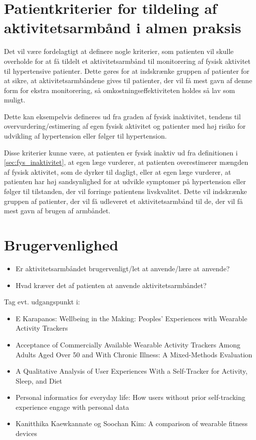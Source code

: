 \section{Patientkriterier for tildeling af aktivitetsarmbånd i almen praksis}

\noindent
Det vil være fordelagtigt at definere nogle kriterier, som patienten vil skulle overholde for at få tildelt et aktivitetsarmbånd til monitorering af fysisk aktivitet til hypertensive patienter. Dette gøres for at indskrænke gruppen af patienter for at sikre, at aktivitetsarmbåndene gives til patienter, der vil få mest gavn af denne form for ekstra monitorering, så omkostningseffektiviteten holdes så lav som muligt.

Dette kan eksempelvis defineres ud fra graden af fysisk inaktivitet, tendens til overvurdering/estimering af egen fysisk aktivitet og patienter med høj risiko for udvikling af hypertension eller følger til hypertension. 

Disse kriterier kunne være, at patienten er fysisk inaktiv ud fra definitionen i \autoref{sec:fys_inaktivitet}, at egen læge vurderer, at patienten overestimerer mængden af fysisk aktivitet, som de dyrker til dagligt, eller at egen læge vurderer, at patienten har høj sandsynlighed for at udvikle symptomer på hypertension eller følger til tilstanden, der vil forringe patientens livskvalitet. Dette vil indskrænke gruppen af patienter, der vil få udleveret et aktivitetsarmbånd til de, der vil få mest gavn af brugen af armbåndet. 


\section{Brugervenlighed}
\begin{itemize}
\item Er aktivitetsarmbåndet brugervenligt/let at anvende/lære at anvende?
\item Hvad kræver det af patienten at anvende aktivitetsarmbåndet?
\end{itemize}
Tag evt. udgangspunkt i: 
\begin{itemize}
\item E Karapanos: Wellbeing in the Making: Peoples' Experiences with Wearable Activity Trackers
\item Acceptance of Commercially Available Wearable Activity Trackers Among Adults Aged Over 50 and With Chronic Illness: A Mixed-Methods Evaluation
\item A Qualitative Analysis of User Experiences With a Self-Tracker for Activity, Sleep, and Diet
\item Personal informatics for everyday life: How users without prior self-tracking experience engage with personal data
\item Kanitthika Kaewkannate og Soochan Kim: A comparison of wearable fitness devices
\end{itemize}

